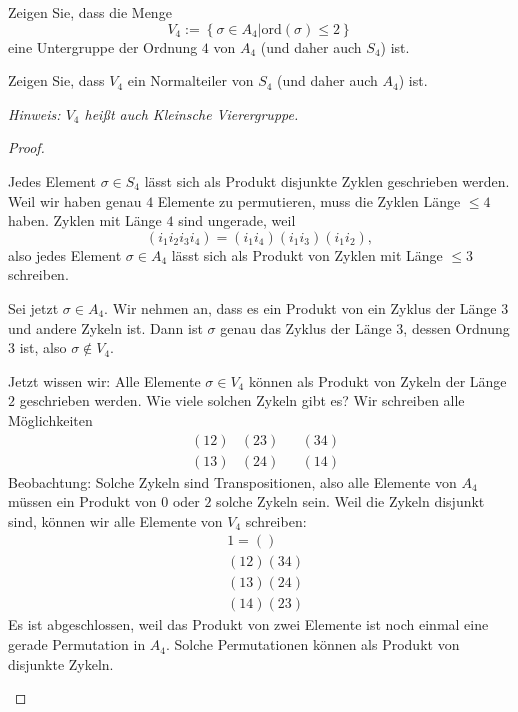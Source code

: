 \begin{Problem}
	\begin{parts}
	\item Zeigen Sie, dass die Menge
		\[
			V_4:=\left\{ \sigma\in A_4|\text{ord}(\sigma)\le 2 \right\} 
		\]
		eine Untergruppe der Ordnung $4$ von $A_4$ (und daher auch $S_4$) ist.
	\item Zeigen Sie, dass $V_4$ ein Normalteiler von $S_4$ (und daher auch $A_4$) ist.

		{\footnotesize \emph{Hinweis: $V_4$ heißt auch Kleinsche Vierergruppe.}}
	\end{parts}
\end{Problem}
\begin{proof}
	\begin{parts}
	\item Jedes Element $\sigma\in S_4$ lässt sich als Produkt disjunkte Zyklen geschrieben werden. Weil wir haben genau $4$ Elemente zu permutieren, muss die Zyklen Länge $\le 4$ haben. Zyklen mit Länge $4$ sind ungerade, weil
		\[ 
			(i_1i_2i_3i_4)=(i_1i_4)(i_1i_3)(i_1i_2)
		,\] 
		also jedes Element $\sigma\in A_4$ lässt sich als Produkt von Zyklen mit Länge $\le 3$ schreiben.

		Sei jetzt $\sigma\in A_4$. Wir nehmen an, dass es ein Produkt von ein Zyklus der Länge $3$ und andere Zykeln ist. Dann ist $\sigma$ genau das Zyklus der Länge $3$, dessen Ordnung $3$ ist, also $\sigma \not\in V_4$.

		Jetzt wissen wir: Alle Elemente $\sigma\in V_4$ können als Produkt von Zykeln der Länge $2$ geschrieben werden. Wie viele solchen Zykeln gibt es? Wir schreiben alle Möglichkeiten
		\begin{align*}
			& (12) & (23) & & (34) \\ & (13) & (24) & & (14)
		\end{align*}
Beobachtung: Solche Zykeln sind Transpositionen, also alle Elemente von $A_4$ müssen ein Produkt von $0$ oder $2$ solche Zykeln sein. Weil die Zykeln disjunkt sind, können wir alle Elemente von $V_4$ schreiben:
\begin{align*}
	& 1 = \left( \right) \\
	& (12)(34)\\
	& (13)(24)\\
	& (14)(23)
\end{align*}
Es ist abgeschlossen, weil das Produkt von zwei Elemente ist noch einmal eine gerade Permutation in $A_4$. Solche Permutationen können als Produkt von disjunkte Zykeln.
	\end{parts}
\end{proof}
